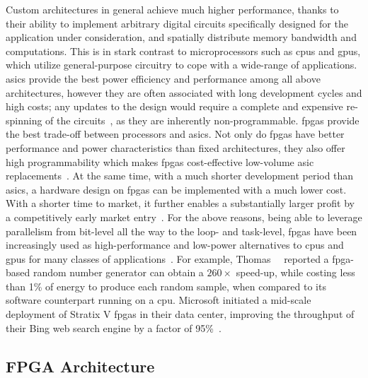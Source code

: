 Custom architectures in general achieve much higher performance, thanks to
their ability to implement arbitrary digital circuits specifically designed
for the application under consideration, and spatially distribute memory
bandwidth and computations.  This is in stark contrast to microprocessors
such as \glspl{cpu} and \glspl{gpu}, which utilize general-purpose circuitry
to cope with a wide-range of applications. \glspl{asic} provide the best
power efficiency and performance among all above architectures, however
they are often associated with long development cycles and high costs; any
updates to the design would require a complete and expensive re-spinning
of the circuits~\cite{bacon13}, as they are inherently non-programmable.
\Glspl{fpga} provide the best trade-off between processors and \glspl{asic}.
Not only do \glspl{fpga} have better performance and power characteristics
than fixed architectures, they also offer high programmability which makes
\glspl{fpga} cost-effective low-volume \gls{asic} replacements~\cite{karen04,
bacon13}.  At the same time, with a much shorter development period than
\glspl{asic}, a hardware design on \glspl{fpga} can be implemented with a much
lower cost.  With a shorter time to market, it further enables a substantially
larger profit by a competitively early market entry~\cite{semico12}.  For
the above reasons, being able to leverage parallelism from bit-level all the
way to the loop- and task-level, \glspl{fpga} have been increasingly used as
high-performance and low-power alternatives to \glspl{cpu} and \glspl{gpu}
for many classes of applications~\cite{bacon13, brodtkorb10, sirowy08}.  For
example, Thomas~\etal~\cite{thomas09} reported a \gls{fpga}-based random number
generator can obtain a $260\times$ speed-up, while costing less than 1\% of
energy to produce each random sample, when compared to its software counterpart
running on a \gls{cpu}\@.  Microsoft initiated a mid-scale deployment of
Stratix V \glspl{fpga} in their data center, improving the throughput of their
Bing web search engine by a factor of 95\%~\cite{catapult}.


\subsection{FPGA Architecture}
\label{bg:sub:fpga_architecture}

